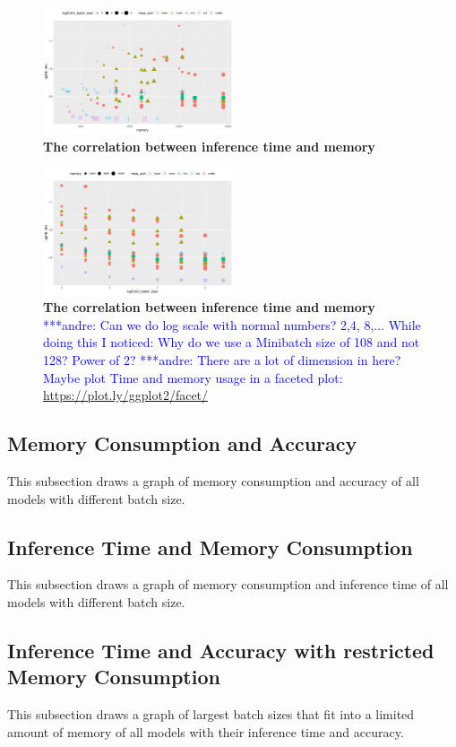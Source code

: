 \documentclass[conference]{IEEEtran}
\newcommand{\alnote}[1]{ {\textcolor{blue} { ***andre: #1 }}}
\newcommand{\alnote}[1]{}
\begin{document}
\begin{figure}[htpb]
	  \centering
	  \includegraphics[width=0.5\textwidth]{RunningTimeVSMemory-Batch}
	  \caption{\textbf{The correlation between inference time and memory}}
	  \label{fig:running-memory-batch}
\end{figure}

\begin{figure}[htpb]
	  \centering
	  \includegraphics[width=0.5\textwidth]{RunningTimeVSBatch}
	  \caption{\textbf{The correlation between inference time and memory}\alnote{Can we do log scale with normal numbers? 2,4, 8,... While doing this I noticed: Why do we use a Minibatch size of 108 and not 128? Power of 2?} \alnote{There are a lot of dimension in here? Maybe plot Time and memory usage in a faceted plot: \url{https://plot.ly/ggplot2/facet/}}}
	  \label{fig:running-batch2}
\end{figure}

\subsection{Memory Consumption and Accuracy}
This subsection draws a graph of memory consumption and accuracy of all models with different batch size.

\subsection{Inference Time and Memory Consumption}
This subsection draws a graph of memory consumption and inference time of all models with different batch size.

\subsection{Inference Time and Accuracy with restricted Memory Consumption}
This subsection draws a graph of largest batch sizes that fit into a limited amount of memory of all models with their inference time and accuracy.
\end{document}
